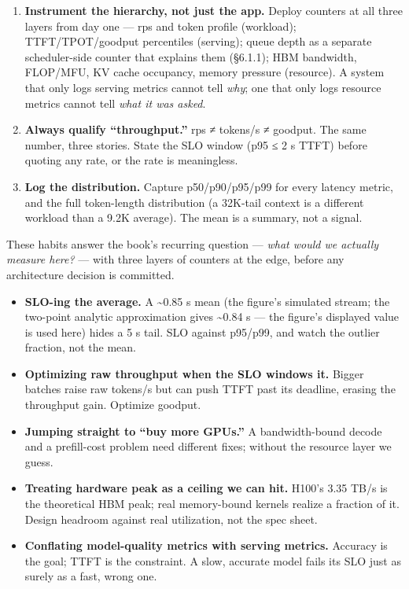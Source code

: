\begin{enumerate}
\def\labelenumi{\arabic{enumi}.}
\item
  \textbf{Instrument the hierarchy, not just the app.} Deploy counters
  at all three layers from day one --- rps and token profile (workload);
  TTFT/TPOT/goodput percentiles (serving); queue depth as a separate
  scheduler-side counter that explains them (§6.1.1); HBM bandwidth,
  FLOP/MFU, KV cache occupancy, memory pressure (resource). A system
  that only logs serving metrics cannot tell \emph{why}; one that only
  logs resource metrics cannot tell \emph{what it was asked}.
\item
  \textbf{Always qualify ``throughput.''} rps ≠ tokens/s ≠ goodput. The
  same number, three stories. State the SLO window (p95 ≤ 2 s TTFT)
  before quoting any rate, or the rate is meaningless.
\item
  \textbf{Log the distribution.} Capture p50/p90/p95/p99 for every
  latency metric, and the full token-length distribution (a 32K-tail
  context is a different workload than a 9.2K average). The mean is a
  summary, not a signal.
\end{enumerate}

These habits answer the book's recurring question --- \emph{what would
we actually measure here?} --- with three layers of counters at the
edge, before any architecture decision is committed.

\label{common-mistakes}


\begin{itemize}
\tightlist
\item
  \textbf{SLO-ing the average.} A \textasciitilde0.85 s mean (the
  figure's simulated stream; the two-point analytic approximation gives
  \textasciitilde0.84 s --- the figure's displayed value is used here)
  hides a 5 s tail. SLO against p95/p99, and watch the outlier fraction,
  not the mean.
\item
  \textbf{Optimizing raw throughput when the SLO windows it.} Bigger
  batches raise raw tokens/s but can push TTFT past its deadline,
  erasing the throughput gain. Optimize goodput.
\item
  \textbf{Jumping straight to ``buy more GPUs.''} A bandwidth-bound
  decode and a prefill-cost problem need different fixes; without the
  resource layer we guess.
\item
  \textbf{Treating hardware peak as a ceiling we can hit.} H100's 3.35
  TB/s is the theoretical HBM peak; real memory-bound kernels realize a
  fraction of it. Design headroom against real utilization, not the spec
  sheet.
\item
  \textbf{Conflating model-quality metrics with serving metrics.}
  Accuracy is the goal; TTFT is the constraint. A slow, accurate model
  fails its SLO just as surely as a fast, wrong one.
\end{itemize}

